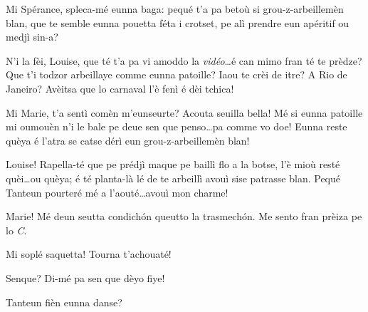 \begin{drama}


\Louisespeaks Mi Spérance, spleca-mé eunna baga: pequé t'a pa betoù si grou-z-arbeillemèn blan, que te semble eunna pou\-et\-ta féta i crotset, pe alì prendre eun apéritif ou medjì sin-a?

\Sperancespeaks  N'i la fèi, Louise, que té t'a pa vi amoddo la \textit{vidéo}\ldots é can mimo fran té te prèdze? Que t'i todzor arbeillaye comme eunna patoille? Iaou te crèi de itre? A Rio de Janeiro? Avèitsa que lo carnaval l'è fenì é dèi tchica!

\Louisespeaks Mi Marie, t’a sentì comèn m’eunseurte? Acouta seuilla bel\-la! Mé si eunna patoille mi oumouèn n'i le bale pe deue sen que penso\ldots pa comme vo doe! Eunna reste quèya é l'atra se catse dérì eun grou-z-arbeillemèn blan!

\Alicespeaks  Louise! Rapella-té que pe prédjì maque pe baillì flo a la botse, l’è mioù resté quèi\ldots ou quèya;  é té planta-là lé de te arbeillì avouì sise patrasse blan. Pequé Tanteun pourteré mé a l’aouté\ldots avouì mon charme!


\Sperancespeaks Marie! Mé deun seutta condich\'on queutto la trasmech\'on. Me sento fran prèiza pe lo \textit{C}.


\Alicespeaks Mi soplé saquetta! Tourna t'achouaté!

\Sperancespeaks Senque? Di-mé pa sen que dèyo fiye!


\Louisespeaks{} Tanteun fièn eunna danse?





\end{drama}
